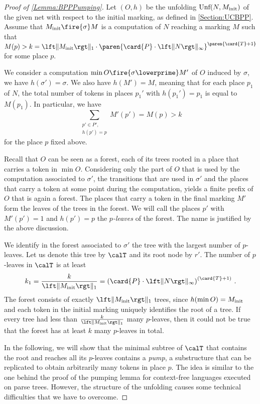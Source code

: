 \documentclass[../../diss.tex]{subfiles}
\begin{document}
\begin{proof}[Proof of \cref{Lemma:BPPPumping}]
    Let $(O,h)$ be the unfolding $\text{Unf}(N, M_{\text{init}})$ of the given net with respect to the initial marking, as defined in \cref{Section:UCBPP}.
    Assume that $\Minit \fire{\sigma} M$ is a computation of $N$ reaching a marking $M$ such that $M(p) > k = \normone{\Minit} \cdot \paren{ \card{P} \cdot \norminf{N}}^{ \paren{\card{T} + 1} }$ for some place $p$.

    We consider a computation $\min O \fire{\sigma\lowerprime} M'$ of $O$ induced by $\sigma$, \ie we have $h(\sigma') = \sigma$.
    We also have $h(M') = M$, meaning that for each place $p_1$ of $N$, the total number of tokens in places $p_1'$ with $h(p_1') = p_1$ is equal to $M(p_1)$.
    In particular, we have
    \[
        \sum_{\substack{p' \in P',\\  h(p') = p}} M' (p') = M(p) > k
    \]
    for the place $p$ fixed above.

    Recall that $O$ can be seen as a forest, each of its trees rooted in a place that carries a token in $\min O$.
    Considering only the part of $O$ that is used by the computation associated to $\sigma'$, \ie the transitions that are used in $\sigma'$ and the places that carry a token at some point during the computation, yields a finite prefix of $O$ that is again a forest.
    The places that carry a token in the final marking $M'$ form the leaves of the trees in the forest.
    We will call the places $p'$ with $M'(p') = 1$ and $h(p') = p$ the \emph{$p$-leaves} of the forest.
    The name is justified by the above discussion.

    We identify in the forest associated to $\sigma'$ the tree with the largest number of $p$-leaves.
    Let us denote this tree by $\calT$ and its root node by $r'$.
    The number of $p$-leaves in $\calT$ is at least
    \[
        k_1 = \frac{k}{\normone{M_\init}} = {(\card{P} \cdot \norminf{N})}^{(\card{T} + 1)}
        \ .
    \]
    The forest consists of exactly $\normone{\Minit}$ trees, since $h(\min O) = M_{\text{init}}$ and each token in the initial marking uniquely identifies the root of a tree.
    If every tree had less than $\frac{k}{\normone{\Minit}}$ many $p$-leaves, then it could not be true that the forest has at least $k$ many $p$-leaves in total.

    In the following, we will show that the minimal subtree of $\calT$ that contains the root and reaches all its $p$-leaves contains a \emph{pump}, \ie a substructure that can be replicated to obtain arbitrarily many tokens in place $p$.
    The idea is similar to the one behind the proof of the pumping lemma for context-free languages executed on parse trees.
    However, the structure of the unfolding causes some technical difficulties that we have to overcome.


\end{proof}
\end{document}
